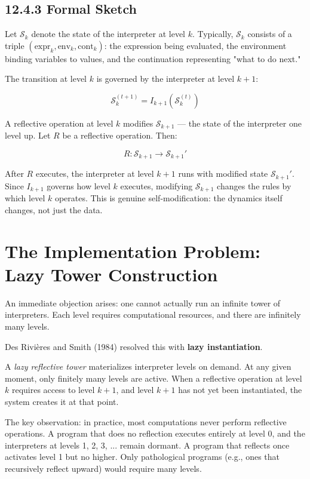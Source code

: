 \subsection{12.4.3 Formal Sketch}

Let $\mathcal{S}_k$ denote the state of the interpreter at level $k$. Typically, $\mathcal{S}_k$ consists of a triple $(\text{expr}_k, \text{env}_k, \text{cont}_k)$: the expression being evaluated, the environment binding variables to values, and the continuation representing "what to do next."

The transition at level $k$ is governed by the interpreter at level $k + 1$:

\[\mathcal{S}_k^{(t+1)} = I_{k+1}(\mathcal{S}_k^{(t)})\]

A reflective operation at level $k$ modifies $\mathcal{S}_{k+1}$ --- the state of the interpreter one level up. Let $R$ be a reflective operation. Then:

\[R: \mathcal{S}_{k+1} \to \mathcal{S}_{k+1}'\]

After $R$ executes, the interpreter at level $k + 1$ runs with modified state $\mathcal{S}_{k+1}'$. Since $I_{k+1}$ governs how level $k$ executes, modifying $\mathcal{S}_{k+1}$ changes the rules by which level $k$ operates. This is genuine self-modification: the dynamics itself changes, not just the data.

\section{The Implementation Problem: Lazy Tower Construction}

An immediate objection arises: one cannot actually run an infinite tower of interpreters. Each level requires computational resources, and there are infinitely many levels.

Des Rivières and Smith (1984) resolved this with \textbf{lazy instantiation}.

\begin{definition}
A \textit{lazy reflective tower} materializes interpreter levels on demand. At any given moment, only finitely many levels are active. When a reflective operation at level $k$ requires access to level $k + 1$, and level $k + 1$ has not yet been instantiated, the system creates it at that point.

The key observation: in practice, most computations never perform reflective operations. A program that does no reflection executes entirely at level 0, and the interpreters at levels 1, 2, 3, ... remain dormant. A program that reflects once activates level 1 but no higher. Only pathological programs (e.g., ones that recursively reflect upward) would require many levels.
\end{definition}


